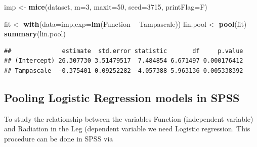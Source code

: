 \documentclass[]{book}
\newenvironment{Shaded}{\begin{snugshade}}{\end{snugshade}}
\newcommand{\KeywordTok}[1]{\textcolor[rgb]{0.13,0.29,0.53}{\textbf{#1}}}
\newcommand{\DataTypeTok}[1]{\textcolor[rgb]{0.13,0.29,0.53}{#1}}
\newcommand{\DecValTok}[1]{\textcolor[rgb]{0.00,0.00,0.81}{#1}}
\newcommand{\StringTok}[1]{\textcolor[rgb]{0.31,0.60,0.02}{#1}}
\newcommand{\CommentTok}[1]{\textcolor[rgb]{0.56,0.35,0.01}{\textit{#1}}}
\newcommand{\OperatorTok}[1]{\textcolor[rgb]{0.81,0.36,0.00}{\textbf{#1}}}
\newcommand{\NormalTok}[1]{#1}
\theoremstyle{definition}
\theoremstyle{definition}
\theoremstyle{definition}
\theoremstyle{remark}
\begin{document}
\begin{Shaded}
\begin{Highlighting}[]
\NormalTok{imp <-}\StringTok{ }\KeywordTok{mice}\NormalTok{(dataset, }\DataTypeTok{m=}\DecValTok{3}\NormalTok{, }\DataTypeTok{maxit=}\DecValTok{50}\NormalTok{, }\DataTypeTok{seed=}\DecValTok{3715}\NormalTok{, }\DataTypeTok{printFlag=}\NormalTok{F)}

\NormalTok{fit <-}\StringTok{ }\KeywordTok{with}\NormalTok{(}\DataTypeTok{data=}\NormalTok{imp,}\DataTypeTok{exp=}\KeywordTok{lm}\NormalTok{(Function }\OperatorTok{~}\StringTok{ }\NormalTok{Tampascale))}
\NormalTok{lin.pool <-}\StringTok{ }\KeywordTok{pool}\NormalTok{(fit)}
\KeywordTok{summary}\NormalTok{(lin.pool)}
\end{Highlighting}
\end{Shaded}

\begin{verbatim}
##              estimate  std.error statistic       df     p.value
## (Intercept) 26.307730 3.51479517  7.484854 6.671497 0.000176412
## Tampascale  -0.375401 0.09252282 -4.057388 5.963136 0.005338392
\end{verbatim}

\begin{Shaded}
\end{Shaded}

\subsection{Pooling Logistic Regression models in
SPSS}\label{pooling-logistic-regression-models-in-spss}

To study the relationship between the variables Function (independent
variable) and Radiation in the Leg (dependent variable we need Logistic
regression. This procedure can be done in SPSS via
\end{document}
